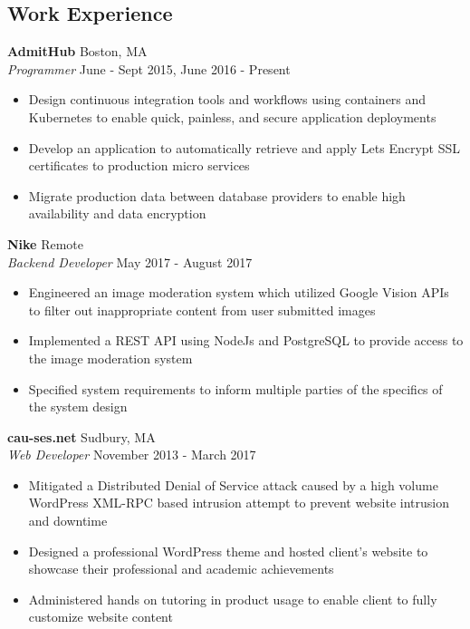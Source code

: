 \documentclass[10pt]{article}
\begin{document}
\begin{flushleft}
\section{Work Experience}
	\textbf{AdmitHub} \hfill Boston, MA \\
	\textit{Programmer} \hfill June - Sept 2015, June 2016 - Present \\
	\begin{itemize}
		\item Design continuous integration tools and workflows using 
		      containers and Kubernetes to enable quick, painless, and 
		      secure application deployments
		\item Develop an application to automatically retrieve and apply 
		      Lets Encrypt SSL certificates to production micro services
		\item Migrate production data between database providers to 
		      enable high availability and data encryption
	\end{itemize}

	\vspace{1em}
	\textbf{Nike} \hfill Remote \\
	\textit{Backend Developer} \hfill May 2017 - August 2017 \\
	\begin{itemize}
		\item Engineered an image moderation system which utilized 
		      Google Vision APIs to filter out inappropriate content 
		      from user submitted images
		\item Implemented a REST API using NodeJs and PostgreSQL to 
		      provide access to the image moderation system
		\item Specified system requirements to inform multiple parties 
		      of the specifics of the system design
	\end{itemize}

	\vspace{1em}
	\textbf{cau-ses.net} \hfill Sudbury, MA \\
	\textit{Web Developer} \hfill November 2013 - March 2017 \\
	\begin{itemize}
		\item Mitigated a Distributed Denial of Service attack caused  
		      by a high volume WordPress XML-RPC based intrusion 
		      attempt to prevent website intrusion and downtime
		\item Designed a professional WordPress theme and hosted 
		      client's website to showcase their professional and
		      academic achievements
		\item Administered hands on tutoring in product usage to enable
		      client to fully customize website content
	\end{itemize}


\end{flushleft}
\end{document}
